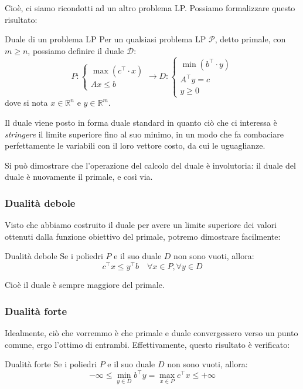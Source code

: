 \documentclass[a4paper,11pt]{article}
\begin{document}
Cioè, ci siamo ricondotti ad un altro problema LP.
Possiamo formalizzare questo risultato:
\begin{definition}{Duale di un problema LP}
	Per un qualsiasi problema LP $\mathcal{P}$, detto primale, con $m \geq n$, possiamo definire il duale $\mathcal{D}$:
	\[
		P:
		\begin{cases}
			\max(c^\intercal \cdot x) \\ 
			Ax \leq b
		\end{cases}
	\rightarrow
		D:
		\begin{cases}
			\min(b^\intercal \cdot y) \\ 
			A^\intercal y = c \\
			y \geq 0
		\end{cases}
	\]
	dove si nota $x \in \mathbb{R}^n$ e $y \in \mathbb{R}^m$.
\end{definition}

Il duale viene posto in forma duale standard in quanto ciò che ci interessa è \textit{stringere} il limite superiore fino al suo minimo, in un modo che fa combaciare perfettamente le variabili con il loro vettore costo, da cui le uguaglianze.

Si può dimostrare che l'operazione del calcolo del duale è involutoria: il duale del duale è nuovamente il primale, e così via.

\subsubsection{Dualità debole}
Visto che abbiamo costruito il duale per avere un limite superiore dei valori ottenuti dalla funzione obiettivo del primale, potremo dimostrare facilmente:
\begin{theorem}{Dualità debole}
	Se i poliedri $P$ e il suo duale $D$ non sono vuoti, allora:
	$$ c^\intercal x \leq y^\intercal b \quad \forall x \in P, \forall y \in D$$
\end{theorem}
Cioè il duale è sempre maggiore del primale.

\subsubsection{Dualità forte}
Idealmente, ciò che vorremmo è che primale e duale convergessero verso un punto comune, ergo l'ottimo di entrambi.
Effettivamente, questo risultato è verificato:
\begin{theorem}{Dualità forte}
	Se i poliedri $P$ e il suo duale $D$ non sono vuoti, allora:
	$$ -\infty \leq \min_{y \in D} b^\intercal y = \max_{x \in P} c^\intercal x \leq +\infty $$
\end{theorem}
\end{document}
